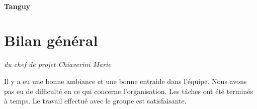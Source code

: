 \documentclass[12pt]{article}
\begin{document}
\paragraph{ Tanguy}

\section{Bilan général}
\vspace{-0.5cm}\hspace{0.5cm}\textit{du chef de projet Chiaverini Marie}
\vspace{0.5cm}

Il y a eu une bonne ambiance et une bonne entraide dans l'équipe. Nous avons pas eu de difficulté en ce qui concerne l'organisation. Les tâches ont été terminés à temps. Le travail effectué avec le groupe est satisfaisante.
\end{document}
